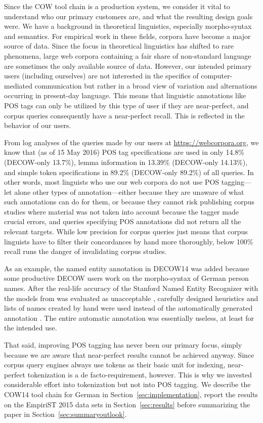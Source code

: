\documentclass[11pt]{article}
\begin{document}
Since the COW tool chain is a production system, we consider it vital to understand who our primary customers are, and what the resulting design goals were.
We have a background in theoretical linguistics, especially morpho-syntax and semantics.
For empirical work in these fields, corpora have become a major source of data.
Since the focus in theoretical linguistics has shifted to rare phenomena, large web corpora containing a fair share of non-standard language are sometimes the only available source of data.
However, our intended primary users (including ourselves) are not interested in the specifics of computer-mediated communication but rather in a broad view of variation and alternations occurring in present-day language.
This means that linguistic annotations like POS tags can only be utilized by this type of user if they are near-perfect, and corpus queries consequently have a near-perfect recall.
This is reflected in the behavior of our users.

From log analyses of the queries made by our users at \url{https://webcorpora.org}, we know that (as of 15 May 2016) POS tag specifications are used in only 14.8\% (DECOW-only 13.7\%), lemma information in 13.39\% (DECOW-only 14.13\%), and simple token specifications in 89.2\% (DECOW-only 89.2\%) of all queries.
In other words, most linguists who use our web corpora do not use POS tagging---let alone other types of annotation---either because they are unaware of what such annotations can do for them, or because they cannot risk publishing corpus studies where material was not taken into account because the tagger made crucial errors, and queries specifying POS annotations did not return all the relevant targets.
While low precision for corpus queries just means that corpus linguists have to filter their concordances by hand more thoroughly, below 100\% recall runs the danger of invalidating corpus studies.

As an example, the named entity annotation in DECOW14 was added because some productive DECOW users work on the morpho-syntax of German person names.
After the real-life accuracy of the Stanford Named Entity Recognizer with the models from  was evaluated as unacceptable \cite{Helmers2013}, carefully designed heuristics and lists of names created by hand were used instead of the automatically generated annotation \cite{Ackermann2016}.
The entire automatic annotation was essentially useless, at least for the intended use.

That said, improving POS tagging has never been our primary focus, simply because we are aware that near-perfect results cannot be achieved anyway.
Since corpus query engines always use tokens as their basic unit for indexing, near-perfect tokenization is a de facto-requirement, however.
This is why we invested considerable effort into tokenization but not into POS tagging.
We describe the COW14 tool chain for German in Section~\ref{sec:implementation}, report the results on the EmpiriST 2015 data sets in Section~\ref{sec:results} before summarizing the paper in Section~\ref{sec:summaryoutlook}.
\end{document}
